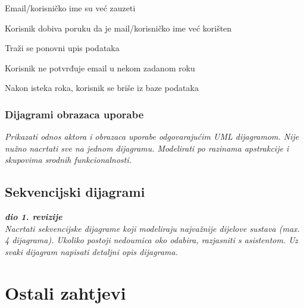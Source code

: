 \begin{packed_item}
\begin{packed_item}
							\item[3.a]Email/korisničko ime su već zauzeti
							\item[] \begin{packed_enum}
								
								\item Korisnik dobiva poruku da je mail/korisničko ime već korišten
								\item Traži se ponovni upis podataka
								
							\end{packed_enum}
							\item[7.a] Korisnik ne potvrđuje email u nekom zadanom roku
							\item[] \begin{packed_enum}
								
								\item Nakon isteka roka, korisnik se briše iz baze podataka
								
							\end{packed_enum}

							
						\end{packed_item}
					\end{packed_item}
				
					
				\subsubsection{Dijagrami obrazaca uporabe}
					
					\textit{Prikazati odnos aktora i obrazaca uporabe odgovarajućim UML dijagramom. Nije nužno nacrtati sve na jednom dijagramu. Modelirati po razinama apstrakcije i skupovima srodnih funkcionalnosti.}
				\eject		
				
			\subsection{Sekvencijski dijagrami}
				
				\textbf{\textit{dio 1. revizije}}\\
				
				\textit{Nacrtati sekvencijske dijagrame koji modeliraju najvažnije dijelove sustava (max. 4 dijagrama). Ukoliko postoji nedoumica oko odabira, razjasniti s asistentom. Uz svaki dijagram napisati detaljni opis dijagrama.}
				\eject
	
		\section{Ostali zahtjevi}
		
